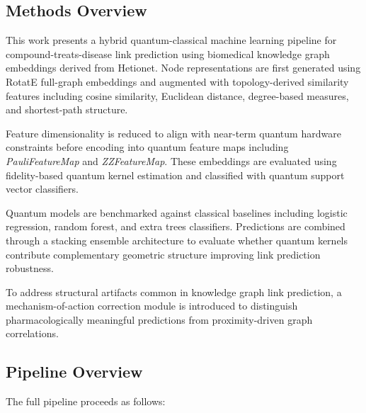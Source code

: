 \documentclass[10pt,twocolumn]{article}
\begin{document}
\subsection{Methods Overview}

This work presents a hybrid quantum-classical machine learning pipeline for compound-treats-disease link prediction using biomedical knowledge graph embeddings derived from Hetionet. Node representations are first generated using RotatE full-graph embeddings and augmented with topology-derived similarity features including cosine similarity, Euclidean distance, degree-based measures, and shortest-path structure.

Feature dimensionality is reduced to align with near-term quantum hardware constraints before encoding into quantum feature maps including \textit{PauliFeatureMap} and \textit{ZZFeatureMap}. These embeddings are evaluated using fidelity-based quantum kernel estimation and classified with quantum support vector classifiers.

Quantum models are benchmarked against classical baselines including logistic regression, random forest, and extra trees classifiers. Predictions are combined through a stacking ensemble architecture to evaluate whether quantum kernels contribute complementary geometric structure improving link prediction robustness.

To address structural artifacts common in knowledge graph link prediction, a mechanism-of-action correction module is introduced to distinguish pharmacologically meaningful predictions from proximity-driven graph correlations.

\subsection{Pipeline Overview}
\label{sec:pipeline}

The full pipeline proceeds as follows:
\end{document}
